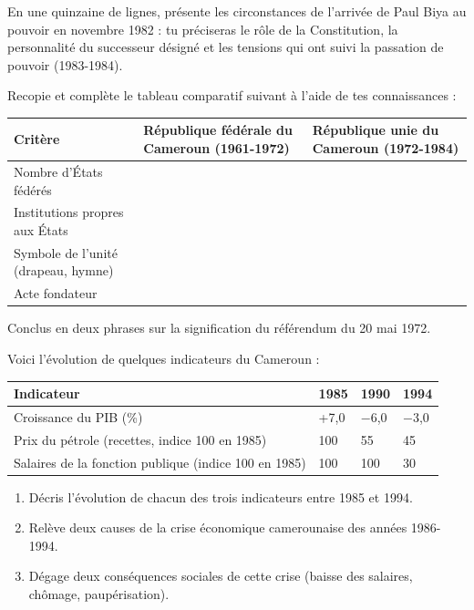 \documentclass[11pt]{article}
\begin{document}
\begin{exercice}
En une quinzaine de lignes, présente les circonstances de l'arrivée de Paul Biya au pouvoir en novembre 1982 : tu préciseras le rôle de la Constitution, la personnalité du successeur désigné et les tensions qui ont suivi la passation de pouvoir (1983-1984).
\end{exercice}

\begin{exercice}
Recopie et complète le tableau comparatif suivant à l'aide de tes connaissances :

\begin{center}
\begin{tabularx}{\linewidth}{|l|X|X|}\hline
\rowcolor{popblueL} Critère & République fédérale du Cameroun (1961-1972) & République unie du Cameroun (1972-1984) \\ \hline
Nombre d'États fédérés & & \\ \hline
Institutions propres aux États & & \\ \hline
Symbole de l'unité (drapeau, hymne) & & \\ \hline
Acte fondateur & & \\ \hline
\end{tabularx}
\end{center}

Conclus en deux phrases sur la signification du référendum du 20 mai 1972.
\end{exercice}

\begin{exercice}
Voici l'évolution de quelques indicateurs du Cameroun :

\begin{center}
\begin{tabularx}{\linewidth}{|l|X|X|X|}\hline
\rowcolor{popblueL} Indicateur & 1985 & 1990 & 1994 \\ \hline
Croissance du PIB (\%) & +7,0 & $-$6,0 & $-$3,0 \\ \hline
Prix du pétrole (recettes, indice 100 en 1985) & 100 & 55 & 45 \\ \hline
Salaires de la fonction publique (indice 100 en 1985) & 100 & 100 & 30 \\ \hline
\end{tabularx}
\end{center}

\begin{enumerate}
\item Décris l'évolution de chacun des trois indicateurs entre 1985 et 1994.
\item Relève deux causes de la crise économique camerounaise des années 1986-1994.
\item Dégage deux conséquences sociales de cette crise (baisse des salaires, chômage, paupérisation).
\end{enumerate}
\end{exercice}
\end{document}

